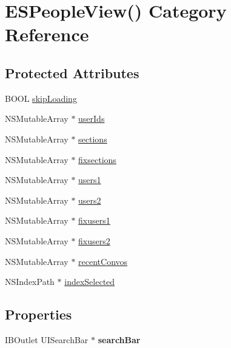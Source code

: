 \hypertarget{category_e_s_people_view_07_08}{}\section{E\+S\+People\+View() Category Reference}
\label{category_e_s_people_view_07_08}
\subsection*{Protected Attributes}
\begin{DoxyCompactItemize}
\item 
B\+O\+O\+L \hyperlink{category_e_s_people_view_07_08_a6ead33d3897e8f5150cbbc90ef419211}{skip\+Loading}
\item 
N\+S\+Mutable\+Array $\ast$ \hyperlink{category_e_s_people_view_07_08_a612fdb0ea8b8e860f7ff21ba8352388c}{user\+Ids}
\item 
N\+S\+Mutable\+Array $\ast$ \hyperlink{category_e_s_people_view_07_08_a96904bde3b0f3fab287cf97a8c9364b1}{sections}
\item 
N\+S\+Mutable\+Array $\ast$ \hyperlink{category_e_s_people_view_07_08_afcff1f649c563bc03d33485da6a0b301}{fixsections}
\item 
N\+S\+Mutable\+Array $\ast$ \hyperlink{category_e_s_people_view_07_08_a44aa509432456def45707ab3b992c158}{users1}
\item 
N\+S\+Mutable\+Array $\ast$ \hyperlink{category_e_s_people_view_07_08_aa0a7c1aa200b51fa9c8e9190fcaa258f}{users2}
\item 
N\+S\+Mutable\+Array $\ast$ \hyperlink{category_e_s_people_view_07_08_a954a179cb18d86817fd3b4369343d72f}{fixusers1}
\item 
N\+S\+Mutable\+Array $\ast$ \hyperlink{category_e_s_people_view_07_08_a99e5b8f0def7ef8a541c15af7bb147fc}{fixusers2}
\item 
N\+S\+Mutable\+Array $\ast$ \hyperlink{category_e_s_people_view_07_08_aa55fcf186ea10b60bac943aa266223aa}{recent\+Convos}
\item 
N\+S\+Index\+Path $\ast$ \hyperlink{category_e_s_people_view_07_08_ac4b9d7c2158586b80c913ed69fd1611f}{index\+Selected}
\end{DoxyCompactItemize}
\subsection*{Properties}
\begin{DoxyCompactItemize}
\item 
\hypertarget{category_e_s_people_view_07_08_a0c810c5182dd32b0560fe954f2ba1ef2}{}I\+B\+Outlet U\+I\+Search\+Bar $\ast$ {\bfseries search\+Bar}\label{category_e_s_people_view_07_08_a0c810c5182dd32b0560fe954f2ba1ef2}

\end{DoxyCompactItemize}


